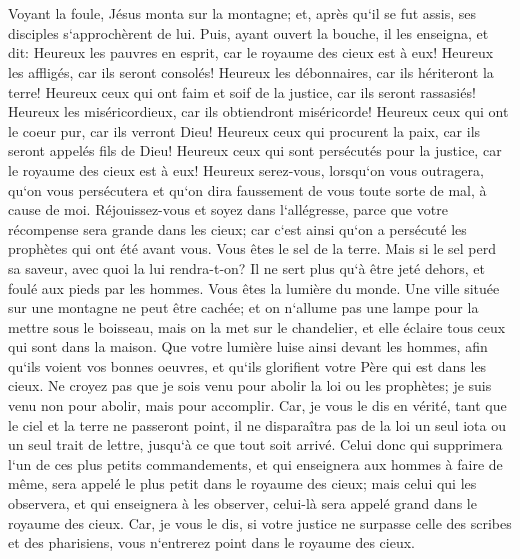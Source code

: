 \chapter{}

\verse Voyant la foule, Jésus monta sur la montagne; et, après qu`il se fut assis, ses disciples s`approchèrent de lui. 
\verse Puis, ayant ouvert la bouche, il les enseigna, et dit: 
\verse Heureux les pauvres en esprit, car le royaume des cieux est à eux! 
\verse Heureux les affligés, car ils seront consolés! 
\verse Heureux les débonnaires, car ils hériteront la terre! 
\verse Heureux ceux qui ont faim et soif de la justice, car ils seront rassasiés! 
\verse Heureux les miséricordieux, car ils obtiendront miséricorde! 
\verse Heureux ceux qui ont le coeur pur, car ils verront Dieu! 
\verse Heureux ceux qui procurent la paix, car ils seront appelés fils de Dieu! 
\verse Heureux ceux qui sont persécutés pour la justice, car le royaume des cieux est à eux! 
\verse Heureux serez-vous, lorsqu`on vous outragera, qu`on vous persécutera et qu`on dira faussement de vous toute sorte de mal, à cause de moi. 
\verse Réjouissez-vous et soyez dans l`allégresse, parce que votre récompense sera grande dans les cieux; car c`est ainsi qu`on a persécuté les prophètes qui ont été avant vous. 
\verse Vous êtes le sel de la terre. Mais si le sel perd sa saveur, avec quoi la lui rendra-t-on? Il ne sert plus qu`à être jeté dehors, et foulé aux pieds par les hommes. 
\verse Vous êtes la lumière du monde. Une ville située sur une montagne ne peut être cachée; 
\verse et on n`allume pas une lampe pour la mettre sous le boisseau, mais on la met sur le chandelier, et elle éclaire tous ceux qui sont dans la maison. 
\verse Que votre lumière luise ainsi devant les hommes, afin qu`ils voient vos bonnes oeuvres, et qu`ils glorifient votre Père qui est dans les cieux. 
\verse Ne croyez pas que je sois venu pour abolir la loi ou les prophètes; je suis venu non pour abolir, mais pour accomplir. 
\verse Car, je vous le dis en vérité, tant que le ciel et la terre ne passeront point, il ne disparaîtra pas de la loi un seul iota ou un seul trait de lettre, jusqu`à ce que tout soit arrivé. 
\verse Celui donc qui supprimera l`un de ces plus petits commandements, et qui enseignera aux hommes à faire de même, sera appelé le plus petit dans le royaume des cieux; mais celui qui les observera, et qui enseignera à les observer, celui-là sera appelé grand dans le royaume des cieux. 
\verse Car, je vous le dis, si votre justice ne surpasse celle des scribes et des pharisiens, vous n`entrerez point dans le royaume des cieux. 
